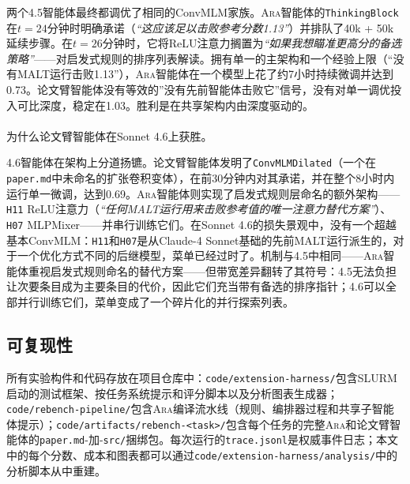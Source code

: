 \documentclass[
]{article}
\makeatletter
\let\oldparagraph\paragraph
\renewcommand{\paragraph}{
    \@ifstar
      \xxxParagraphStar
      \xxxParagraphNoStar
  }
\newcommand{\xxxParagraphStar}[1]{\oldparagraph*{#1}\mbox{}}
\newcommand{\xxxParagraphNoStar}[1]{\oldparagraph{#1}\mbox{}}
\newcommand{\passthrough}[1]{#1}
\theoremstyle{definition}
\newcommand{\ara}{\textsc{Ara}}
\makeatother
\begin{document}
两个4.5智能体最终都调优了相同的ConvMLM家族。\ara{}智能体的\passthrough{\lstinline!ThinkingBlock!}在\(t = 24\)分钟时明确承诺（\emph{``这应该足以击败参考分数1.13''}）并排队了40k
+
50k延续步骤。在\(t = 26\)分钟时，它将ReLU注意力搁置为\emph{``如果我想瞄准更高分的备选策略''}------对启发式规则的排序列表解读。拥有单一的主架构和一个经验上限（``没有MALT运行击败1.13''），\ara{}智能体在一个模型上花了约7小时持续微调并达到0.73。论文臂智能体没有等效的''没有先前智能体击败它''信号，没有对单一调优投入可比深度，稳定在1.03。胜利是在共享架构内由深度驱动的。

\paragraph{为什么论文臂智能体在Sonnet
4.6上获胜。}\label{ux4e3aux4ec0ux4e48ux8bbaux6587ux81c2ux667aux80fdux4f53ux5728sonnet-4.6ux4e0aux83b7ux80dc}

4.6智能体在架构上分道扬镳。论文臂智能体发明了\passthrough{\lstinline!ConvMLMDilated!}（一个在\passthrough{\lstinline!paper.md!}中未命名的扩张卷积变体），在前30分钟内对其承诺，并在整个8小时内运行单一微调，达到0.69。\ara{}智能体则实现了启发式规则层命名的额外架构------\passthrough{\lstinline!H11!}
ReLU注意力（\emph{``任何MALT运行用来击败参考值的唯一注意力替代方案''}）、\passthrough{\lstinline!H07!}
MLPMixer------并串行训练它们。在Sonnet
4.6的损失景观中，没有一个超越基本ConvMLM：\passthrough{\lstinline!H11!}和\passthrough{\lstinline!H07!}是从Claude-4
Sonnet基础的先前MALT运行派生的，对于一个优化方式不同的后继模型，菜单已经过时了。机制与4.5中相同------\ara{}智能体重视启发式规则命名的替代方案------但带宽差异翻转了其符号：4.5无法负担让次要条目成为主要条目的代价，因此它们充当带有备选的排序指针；4.6可以全部并行训练它们，菜单变成了一个碎片化的并行探索列表。

\subsection{可复现性}\label{sec-app-extension-repro}

所有实验构件和代码存放在项目仓库中：\passthrough{\lstinline!code/extension-harness/!}包含SLURM启动的测试框架、按任务系统提示和评分脚本以及分析图表生成器；\passthrough{\lstinline!code/rebench-pipeline/!}包含\ara{}编译流水线（规则、编排器过程和共享子智能体提示）；\passthrough{\lstinline!code/artifacts/rebench-<task>/!}包含每个任务的完整\ara{}和论文臂智能体的\passthrough{\lstinline!paper.md!}-加-\passthrough{\lstinline!src/!}捆绑包。每次运行的\passthrough{\lstinline!trace.jsonl!}是权威事件日志；本文中的每个分数、成本和图表都可以通过\passthrough{\lstinline!code/extension-harness/analysis/!}中的分析脚本从中重建。
\end{document}
